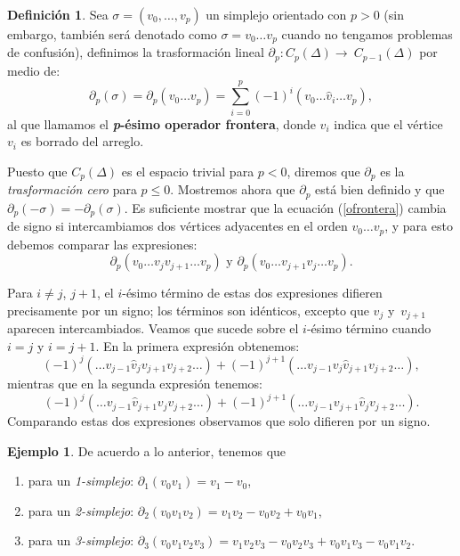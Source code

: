 \documentclass[12pt]{book}
\theoremstyle{definition}
\newtheorem{definition}[theorem]{Definición}
\newtheorem{example}[theorem]{Ejemplo}
\newcounter{in}
\newcounter{ini}
\begin{document}
\begin{definition}
  Sea $\sigma=(v_{0},\ldots ,v_{p})$ un simplejo orientado con $p>0$
  (sin embargo, también será denotado como $\sigma=v_{0}\ldots v_{p}$
  cuando no tengamos problemas de confusión),
  definimos la trasformación lineal
  $\partial_{p}:C_{p}(\Delta)\rightarrow~C_{p-1}(\Delta)$ por medio de:
  \begin{equation}
    \label{ofrontera}
    \partial_{p}(\sigma)=\partial_{p}(v_{0}\ldots
    v_{p})=\sum^{p}_{i=0}(-1)^{i}(v_{0}\ldots \widehat v_{i}\ldots v_{p}),
  \end{equation}
  al que llamamos el \textbf{\emph{p}-ésimo operador frontera}, donde
  $\widehat v_{i}$ indica que el vértice $v_{i}$ es borrado del arreglo.
\end{definition}

Puesto que $C_{p}(\Delta)$ es el espacio trivial para $p<0$, diremos
que $\partial_{p}$ es la \textit{trasformación cero} para $p\leq
0$. Mostremos ahora que $\partial_{p}$ está bien definido y que
$\partial_{p}(-\sigma)=-\partial_{p}(\sigma)$. Es suficiente
mostrar que la ecuación (\ref{ofrontera}) cambia de signo si intercambiamos dos
vértices adyacentes en el orden $v_{0}\ldots v_{p}$, y para esto
debemos comparar las expresiones:
$$\partial_{p}(v_{0}\ldots v_{j} v_{j+1} \ldots v_{p}) \mbox{ y } \partial_{p}(v_{0}\ldots v_{j+1} v_{j} \ldots v_{p}).$$

Para $i\neq j$, $j+1$, el $i$-ésimo término de estas dos expresiones
difieren precisamente por un signo; los términos son idénticos,
excepto que $v_{j}$ y~$v_{j+1}$ aparecen intercambiados. Veamos que
sucede sobre el $i$-ésimo término cuando $i=j$ y $i=j+1$. En la primera
expresión obtenemos:
$$(-1)^{j}(\ldots v_{j-1} \widehat v_{j}v_{j+1}v_{j+2}\ldots)+(-1)^{j+1}(\ldots v_{j-1}v_{j}\widehat v_{j+1}v_{j+2}\ldots),$$
mientras que en la segunda expresión tenemos:
$$(-1)^{j}(\ldots v_{j-1}\widehat v_{j+1}v_{j}v_{j+2}\ldots)+(-1)^{j+1}(\ldots v_{j-1}v_{j+1}\widehat v_{j}v_{j+2}\ldots).$$
Comparando estas dos expresiones observamos que solo difieren por un signo.

\begin{example}
  De acuerdo a lo anterior, tenemos que
  \begin{enumerate}
  \item para un \emph{1-simplejo}: $\partial_{1}(v_{0}v_{1})= v_{1}-v_{0}$,
  \item para un \emph{2-simplejo}: $\partial_{2}(v_{0}v_{1}v_{2})=v_{1}v_{2}-v_{0}v_{2}+v_{0}v_{1}$,
  \item para un \emph{3-simplejo}:
    $\partial_{3}(v_{0}v_{1}v_{2}v_{3})=v_{1}v_{2}v_{3}-v_{0}v_{2}v_{3}+v_{0}v_{1}v_{3}-v_{0}v_{1}v_{2}$. 
  \end{enumerate}
\end{example}
\end{document}
